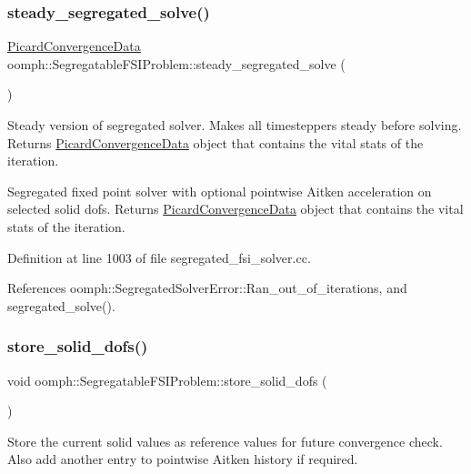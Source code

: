 \subsubsection{\texorpdfstring{steady\+\_\+segregated\+\_\+solve()}{steady\_segregated\_solve()}}
{\footnotesize\ttfamily \hyperlink{classoomph_1_1PicardConvergenceData}{Picard\+Convergence\+Data} oomph\+::\+Segregatable\+F\+S\+I\+Problem\+::steady\+\_\+segregated\+\_\+solve (\begin{DoxyParamCaption}{ }\end{DoxyParamCaption})}



Steady version of segregated solver. Makes all timesteppers steady before solving. Returns \hyperlink{classoomph_1_1PicardConvergenceData}{Picard\+Convergence\+Data} object that contains the vital stats of the iteration. 

Segregated fixed point solver with optional pointwise Aitken acceleration on selected solid dofs. Returns \hyperlink{classoomph_1_1PicardConvergenceData}{Picard\+Convergence\+Data} object that contains the vital stats of the iteration. 

Definition at line 1003 of file segregated\+\_\+fsi\+\_\+solver.\+cc.



References oomph\+::\+Segregated\+Solver\+Error\+::\+Ran\+\_\+out\+\_\+of\+\_\+iterations, and segregated\+\_\+solve().

\mbox{\label{classoomph_1_1SegregatableFSIProblem_af6a9e7b6f13b86bf86b65cfb7c4f966f}} 
\subsubsection{\texorpdfstring{store\+\_\+solid\+\_\+dofs()}{store\_solid\_dofs()}}
{\footnotesize\ttfamily void oomph\+::\+Segregatable\+F\+S\+I\+Problem\+::store\+\_\+solid\+\_\+dofs (\begin{DoxyParamCaption}{ }\end{DoxyParamCaption})}



Store the current solid values as reference values for future convergence check. Also add another entry to pointwise Aitken history if required. 

